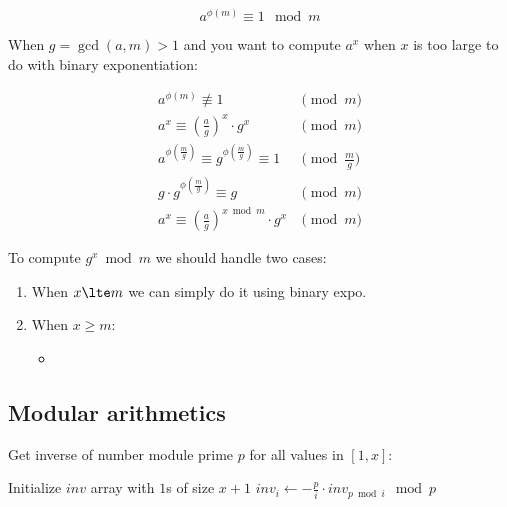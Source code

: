 \documentclass[14pt]{extarticle}
\begin{document}
\[
  a^{\phi(m)} \equiv 1 \mod m
\]

When $g = \gcd(a, m) > 1$ and you want to compute $a^x$ when $x$ is too large to do with binary exponentiation:

\begin{align*}
    a^{\phi(m)} \not\equiv 1 &\pmod{m} \\
    a^{x} \equiv \left(\frac{a}{g}\right)^x \cdot g^x &\pmod{m} \\
    a^{\phi\left(\frac m g\right)} \equiv g^{\phi\left(\frac m g\right)} \equiv 1 &\pmod{\frac{m}{g}} \\
    g \cdot g^{\phi\left(\frac m g\right)} \equiv g &\pmod{m} \\
    a^{x} \equiv \left(\frac{a}{g}\right)^{x \bmod m} \cdot g^x &\pmod{m}
\end{align*}

To compute $g^x \bmod m$ we should handle two cases:

\begin{enumerate}
  \item When $x \lte m$ we can simply do it using binary expo.
  \item When $x \ge m$:
    \begin{itemize}
      \item 
    \end{itemize}
\end{enumerate}


\subsection{Modular arithmetics}

Get inverse of number module prime $p$ for all values in $[1, x]$:

\begin{algorithm}
    \begin{algorithmic}[1]
        \State Initialize $inv$ array with $1$s of size $x + 1$
            \State $inv_i \gets - \frac p i \cdot inv_{p \bmod i} \mod p$
        \EndFor
    \end{algorithmic}
\end{algorithm}
\end{document}
